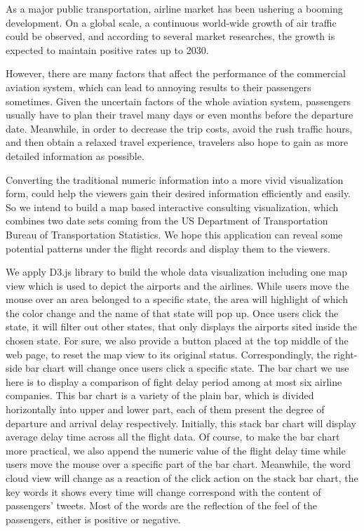 As a major public transportation, airline market has been ushering a booming development. On a global scale, a continuous world-wide growth of air traffic could be observed, and according to several market researches, the growth is expected to maintain positive rates up to 2030.

However, there are many factors that affect the performance of the commercial aviation system, which can lead to annoying results to their passengers sometimes. Given the uncertain factors of the whole aviation system, passengers usually have to plan their travel many days or even months before the departure date. Meanwhile, in order to decrease the trip costs, avoid the rush traffic hours, and then obtain a relaxed travel experience, travelers also hope to gain as more detailed information as possible.

Converting the traditional numeric information into a more vivid visualization form, could help the viewers gain their desired information efficiently and easily. So we intend to build a map based interactive consulting visualization, which combines two date sets coming from the US Department of Transportation Bureau of Transportation Statistics. We hope this application can reveal some potential patterns under the flight records and display them to the viewers.

We apply D3.js library to build the whole data visualization including one map view which is used to depict the airports and the airlines. While users move the mouse over an area belonged to a specific state, the area will highlight of which the color change and the name of that state will pop up. Once users click the state, it will filter out other states, that only displays the airports sited inside the chosen state. For sure, we also provide a button placed at the top middle of the web page, to reset the map view to its original status. Correspondingly, the right-side bar chart will change once users click a specific state. The bar chart we use here is to display a comparison of fight delay period among at most six airline companies. This bar chart is a variety of the plain bar, which is divided horizontally into upper and lower part, each of them present the degree of departure and arrival delay respectively. Initially, this stack bar chart will display average delay time across all the flight data. Of course, to make the bar chart more practical, we also append the numeric value of the flight delay time while users move the mouse over a specific part of the bar chart.\cite{heiberger2014design} Meanwhile, the word cloud view will change as a reaction of the click action on the stack bar chart, the key words it shows every time will change correspond with the content of passengers’ tweets. Most of the words are the reflection of the feel of the passengers, either is positive or negative.



